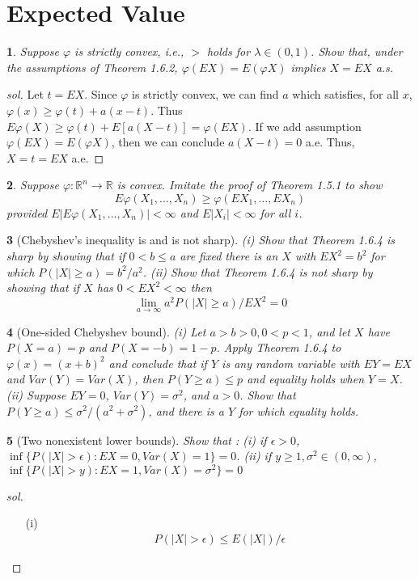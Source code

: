 \documentclass{report}
\newtheorem{ex}{}[section]
\begin{document}
\section{Expected Value}
\begin{ex}
Suppose $\varphi$ is strictly convex, i.e., $>$ holds for $\lambda \in (0,1)$. Show that, under the assumptions of Theorem 1.6.2, $\varphi(EX) = E(\varphi X)$ implies $X = EX$ a.s.
\end{ex}
\begin{proof}[sol]
Let $t = EX$. Since $\varphi$ is strictly convex, we can find $a$ which satisfies, for all $x$, $\varphi(x) \ge \varphi(t) + a(x -t)$. Thus $E\varphi(X) \ge \varphi(t) + E[a(X - t)] = \varphi(EX)$. If we add assumption $\varphi(EX) = E(\varphi X)$, then we can conclude $a(X - t) = 0$ a.e. Thus, $X = t = EX$ a.e. 
\end{proof}
\begin{ex}
Suppose $\varphi : \mathbb{R}^n \to \mathbb{R}$ is convex. Imitate the proof of Theorem 1.5.1 to show
\[E \varphi(X_1,...,X_n) \ge \varphi(EX_1,...,EX_n)\]
provided $E|E \varphi(X_1,...,X_n)| < \infty$ and $E|X_i| < \infty$ for all $i$.
\end{ex}
\begin{ex}[Chebyshev's inequality is and is not sharp]
(i) Show that Theorem 1.6.4 is sharp by showing that if $0 < b \le a$ are fixed there is an $X$ with $EX^2 = b^2$ for which $P(|X| \ge a) = b^2/a^2$. (ii) Show that Theorem 1.6.4 is not sharp by showing that if $X$ has $0 < EX^2 <\infty$ then
\[\lim_{a\to\infty} a^2 P(|X| \ge a)/EX^2 = 0\]
\end{ex}
\begin{ex}[One-sided Chebyshev bound]
(i) Let $a > b > 0, 0 < p < 1$, and let $X$ have $P(X = a) = p$ and $P(X = -b) = 1-p$. Apply Theorem 1.6.4 to $\varphi(x) = (x+b)^2$ and conclude that if $Y$ is any random variable with $EY = EX$ and $Var (Y) = Var (X)$, then $P(Y \ge a) \le p$ and equality holds when $Y = X$.
(ii) Suppose $EY = 0$, $Var(Y) = \sigma^2$, and $a > 0$. Show that $P(Y \ge a) \le \sigma^2 /(a^2 + \sigma^2)$, and there is a $Y$ for which equality holds.
\end{ex}
\begin{ex}[Two nonexistent lower bounds]
Show that : (i) if $\epsilon > 0$, $\inf \{P(|X| > \epsilon) : EX = 0, Var(X) = 1\} = 0$. (ii) if $y \ge 1, \sigma^2 \in (0,\infty)$, $\inf \{P(|X| > y) : EX = 1, Var(X) = \sigma^2\} = 0$
\end{ex}
\begin{proof}[sol]
\begin{enumerate}
    \item[(i)]
    \begin{align*}
        P(|X| > \epsilon) \le E(|X|)/\epsilon
    \end{align*}
\end{enumerate}
\end{proof}
\end{document}
